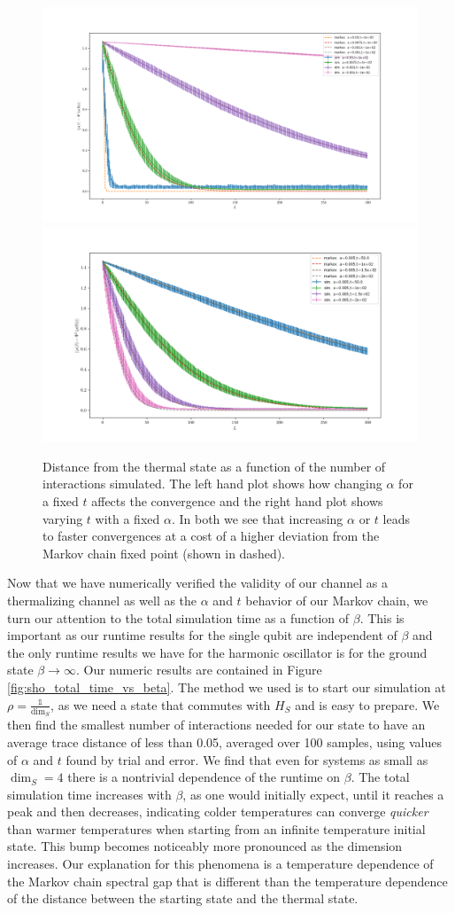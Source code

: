 \documentclass{article}
\newcommand{\identity}{\mathds{1}}
\begin{document}
\begin{figure}
    \centering
    \includegraphics[width=0.45\linewidth]{numerics/data/sho_error_vs_l_fix_alpha.png} \includegraphics[width=0.45\linewidth]{numerics/data/sho_error_vs_l_fix_time.png}
    \caption{Distance from the thermal state as a function of the number of interactions simulated. The left hand plot shows how changing $\alpha$ for a fixed $t$ affects the convergence and the right hand plot shows varying $t$ with a fixed $\alpha$. In both we see that increasing $\alpha$ or $t$ leads to faster convergences at a cost of a higher deviation from the Markov chain fixed point (shown in dashed). }
    \label{fig:sho_error_vs_interactions}
\end{figure}

Now that we have numerically verified the validity of our channel as a thermalizing channel as well as the $\alpha$ and $t$ behavior of our Markov chain, we turn our attention to the total simulation time as a function of $\beta$. This is important as our runtime results for the single qubit are independent of $\beta$ and the only runtime results we have for the harmonic oscillator is for the ground state $\beta \to \infty$. Our numeric results are contained in Figure \ref{fig:sho_total_time_vs_beta}. The method we used is to start our simulation at $\rho = \frac{\identity}{\dim_S}$, as we need a state that commutes with $H_S$ and is easy to prepare. We then find the smallest number of interactions needed for our state to have an average trace distance of less than 0.05, averaged over 100 samples, using values of $\alpha$ and $t$ found by trial and error. We find that even for systems as small as $\dim_S = 4$ there is a nontrivial dependence of the runtime on $\beta$. The total simulation time increases with $\beta$, as one would initially expect, until it reaches a peak and then decreases, indicating colder temperatures can converge \emph{quicker} than warmer temperatures when starting from an infinite temperature initial state. This bump becomes noticeably more pronounced as the dimension increases. Our explanation for this phenomena is a temperature dependence of the Markov chain spectral gap that is different than the temperature dependence of the distance between the starting state and the thermal state. 
\end{document}
